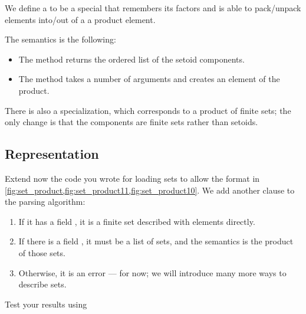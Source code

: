 
We define a  to be a special \Setoid that remembers its factors
and is able to pack/unpack elements into/out of a a product element.


The semantics is the following:
\begin{itemize}
    \item The method  returns the ordered list of the setoid components.
    \item The method  takes a number of arguments and creates an element of the product.
\end{itemize}

There is also a specialization, which corresponds to a product of finite sets; the only change is that the components are finite sets rather than setoids.


\clearpage
\subsection{Representation}


%

%

\begin{codeexercise}
    Extend now the code you wrote for loading sets to allow the format in \cref{fig:set_product,fig:set_product11,fig:set_product10}.
    We add another clause to the parsing algorithm:
    \begin{enumerate}
        \item If it has a field , it is a finite set described with elements directly.
        \item If there is a field , it must be a list of sets, and the semantics is the product of those sets.
        \item Otherwise, it is an error --- for now; we will introduce many more ways to describe sets.
    \end{enumerate}
    Test your results using
\end{codeexercise}
